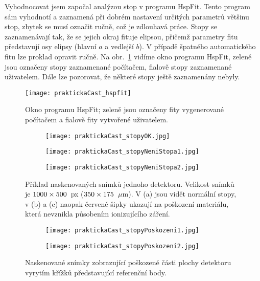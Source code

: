 Vyhodnocovat jsem započal analýzou stop v programu HspFit. Tento program sám vyhodnotí a zaznamená při dobrém nastavení určitých parametrů většinu stop, zbytek se musí označit ručně, což je zdlouhavá práce. Stopy se zaznamenávají tak, že se jejich okraj fituje elipsou, přičemž parametry fitu představují osy elipsy (hlavní $a$ a vedlejší $b$). V případě špatného automatického fitu lze proklad opravit ručně. Na obr.~\ref{fig:praktickaCast_hspfit} vidíme okno programu HspFit, zeleně jsou označeny stopy zaznamenané počítačem, fialově stopy zaznamenané uživatelem. Dále lze pozorovat, že některé stopy ještě zaznamenány nebyly. 
\begin{figure}[ht]
  \centering
  \texttt{[image: praktickaCast\_hspfit]}
  \caption{Okno programu HspFit; zeleně jsou označeny fity vygenerované počítačem a fialově fity vytvořené uživatelem.~\cite{dosis_HSP1000}}
  \label{fig:praktickaCast_hspfit}
\end{figure}
\begin{figure}[p]
  \centering
  \begin{subfigure}{0.7\textwidth}
	\texttt{[image: praktickaCast\_stopyOK.jpg]}
	\caption{}
  \end{subfigure}
  \begin{subfigure}{0.7\textwidth}
	\texttt{[image: praktickaCast\_stopyNeniStopa1.jpg]}
	\caption{}
  \end{subfigure}
  \begin{subfigure}{0.7\textwidth}
	\texttt{[image: praktickaCast\_stopyNeniStopa2.jpg]}
	\caption{}
  \end{subfigure}
  \caption{Příklad naskenovaných snímků jednoho detektoru. Velikost snímků je $1000\times\nobreak500$~px ($350\times\nobreak175$~$\mu$m). V (a) jsou vidět normální stopy, v (b) a (c) naopak červené šipky ukazují na poškození materiálu, která nevznikla působením ionizujícího záření.}
  \label{fig:praktickaCast_stopy}
\end{figure}
\begin{figure}[ht]
  \centering
  \begin{subfigure}{0.7\textwidth}
	\texttt{[image: praktickaCast\_stopyPoskozeni1.jpg]}
	\caption{}
  \end{subfigure}
  \begin{subfigure}{0.7\textwidth}
	\texttt{[image: praktickaCast\_stopyPoskozeni2.jpg]}
	\caption{}
  \end{subfigure}
  \caption{Naskenované snímky zobrazující poškozené části plochy detektoru vyrytím křížků představující referenční body.}
  \label{fig:praktickaCast_stopyPoskozeni}
\end{figure}

